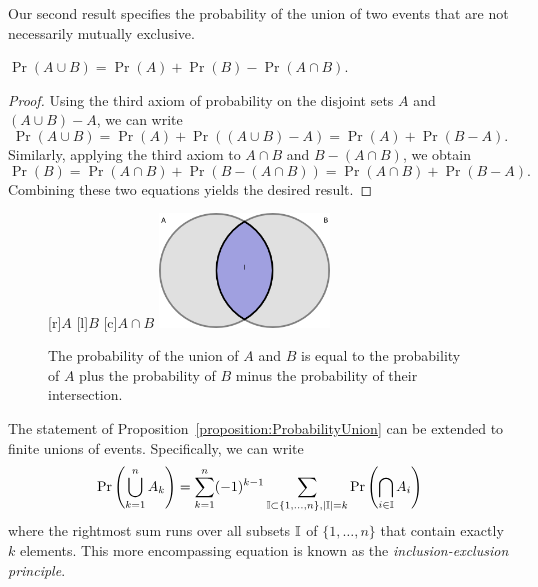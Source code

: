 Our second result specifies the probability of the union of two events that are not necessarily mutually exclusive.
\begin{proposition} \label{proposition:ProbabilityUnion}
$\Pr (A \cup B) = \Pr (A) + \Pr (B) - \Pr (A \cap B)$.
\end{proposition}
\begin{proof}
Using the third axiom of probability on the disjoint sets $A$ and $(A \cup B) - A$, we can write
\begin{equation*}
\Pr (A \cup B)
= \Pr (A) + \Pr ((A \cup B) - A)
= \Pr (A) + \Pr (B - A) .
\end{equation*}
Similarly, applying the third axiom to $A \cap B$ and $B - (A \cap B)$, we obtain
\begin{equation*}
\Pr (B)
= \Pr (A \cap B) + \Pr (B - (A \cap B))
= \Pr (A \cap B) + \Pr (B - A) .
\end{equation*}
Combining these two equations yields the desired result.
\end{proof}
\begin{figure}[htb!]
\begin{center}
\begin{psfrags}
[r]{$A$}
[l]{$B$}
[c]{$A \cap B$}
\includegraphics[height=3.03cm]{Figures/2Chapter/intersection}
\end{psfrags}
\caption{The probability of the union of $A$ and $B$ is equal to the probability of $A$ plus the probability of $B$ minus the probability of their intersection.}
\end{center}
\end{figure}

The statement of Proposition~\ref{proposition:ProbabilityUnion} can be extended to finite unions of events.
Specifically, we can write
\begin{equation*}
\Pr \left( \bigcup_{k=1}^{n} A_k \right)
= \sum_{k = 1}^{n} (-1)^{k-1} \sum_{\mathbb{I} \subset \{1, \ldots, n \}, |\mathbb{I}| =k } \Pr \left( \bigcap_{i \in \mathbb{I}} A_i \right)
\end{equation*}
where the rightmost sum runs over all subsets $\mathbb{I}$ of $\{ 1, \ldots, n \}$ that contain exactly $k$ elements.
This more encompassing equation is known as the \emph{inclusion-exclusion principle}.

